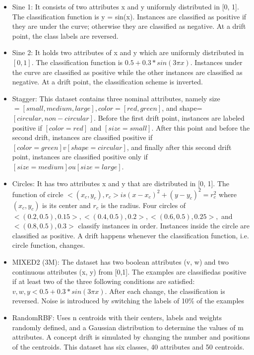 \documentclass[11pt,a4paper]{report}
\begin{document}
\begin{itemize}
\item Sine 1: It consists of two attributes x and y uniformly distributed in [0, 1]. The classification function is y = sin(x). Instances are classified as positive if they are under the curve; otherwise they are classified as negative. At a drift point, the class labels are reversed.

\item Sine 2: It holds two attributes of x and y which are uniformly distributed in $[0, 1]$. The classification function is $0.5 + 0.3 * sin(3\pi x)$. Instances under the curve are classified as positive while the other instances are classified as negative. At a drift point, the classification scheme is inverted. 

\item Stagger: This dataset contains three nominal attributes, namely size $= [small, medium, large], color=[red, green]$, and shape=$[circular, non-circular]$. Before the first drift point, instances are labeled positive if $[color = red]$ and $[size = small]$. After this point and before the second drift, instances are classified positive if$ [color = green] v [shape = circular]$, and finally after this second drift point, instances are classified positive only if $[size = medium] ou [size = large]$.

\item Circles: It has two attributes x and y that are distributed in [0, 1]. The function of circle $<(x_c,y_c), r_c> is (x - x_c)^2 + (y - y_c)^2 = r_c^2$ where $(x_c, y_c)$ is its center and $r_c$ is the radius. Four circles of $<(0.2, 0.5), 0.15>, <(0.4, 0.5), 0.2>, <(0.6, 0.5), 0.25>,$ and $<(0.8, 0.5), 0.3>$ classify instances in order. Instances inside the circle are classified as positive. A drift happens whenever the classification function, i.e. circle function, changes.

\item MIXED2 (3M): The dataset has two boolean attributes (v, w) and two continuous attributes (x, y) from [0,1]. The examples are classifiedas positive if at least two of the three following conditions are satisfied: $v, w, y < 0.5 + 0.3 * sin(3\pi x)$. After each change, the classification is reversed. Noise is introduced by switching the labels of 10\% of the examples

\item RandomRBF: Uses n centroids with their centers, labels and weights randomly defined, and a Gaussian distribution to determine the values of m attributes. A concept drift is simulated by changing the number and positions of the centroids. This dataset has six classes, 40 attributes and 50 centroids. 


\end{itemize}
\end{document}
